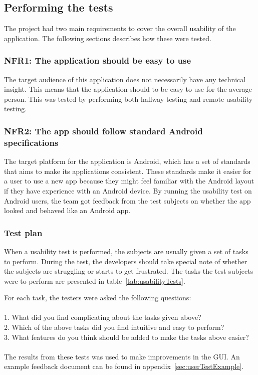 \subsection{Performing the tests}
The project had two main requirements to cover the overall usability of the application. The following sections describes how these were tested.


\subsubsection{NFR1: The application should be easy to use}
The target audience of this application does not necessarily have any technical insight. This means that the application should to be easy to use for the average person. This was tested by performing both hallway testing and remote usability testing.

\subsubsection{NFR2: The app should follow standard Android specifications}
The target platform for the application is Android, which has a set of standards that aims to make its applications consistent. These standards make it easier for a user to use a new app because they might feel familiar with the Android layout if they have experience with an Android device.
By running the usability test on Android users, the team got feedback from the test subjects on whether the app looked and behaved like an Android app.

\subsubsection{Test plan}
When a usability test is performed, the subjects are usually given a set of tasks to perform. During the test, the developers should take special note of whether the subjects are struggling or starts to get frustrated. The tasks the test subjects were to perform are presented in table~\ref{tab:usabilityTests}. 

For each task, the testers were asked the following questions:\\\\
1. What did you find complicating about the tasks given above?\\
2. Which of the above tasks did you find intuitive and easy to perform?\\
3. What features do you think should be added to make the tasks above easier?\\\\
The results from these tests was used to make improvements in the GUI. An example feedback document can be found in appendix~\ref{sec:userTestExample}.

